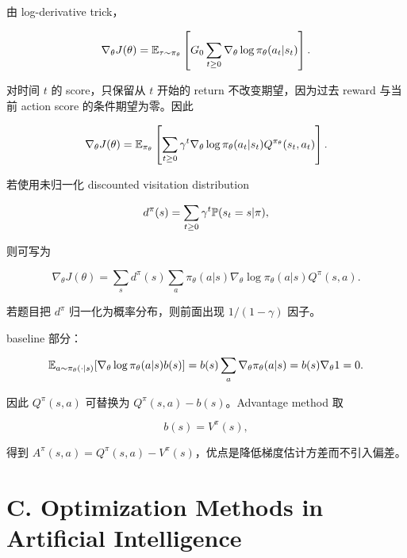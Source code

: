 由 log-derivative trick，

\[
  \nabla_\theta J(\theta)
  =
  \mathbb{E}_{\tau\sim\pi_\theta}
  \left[
    G_0
    \sum_{t\ge0}\nabla_\theta\log\pi_\theta(a_t|s_t)
  \right].
\]

对时间 \(t\) 的 score，只保留从 \(t\) 开始的 return 不改变期望，因为过去 reward 与当前 action score 的条件期望为零。因此

\[
  \nabla_\theta J(\theta)
  =
  \mathbb{E}_{\pi_\theta}
  \left[
    \sum_{t\ge0}
    \gamma^t
    \nabla_\theta\log\pi_\theta(a_t|s_t)
    Q^{\pi_\theta}(s_t,a_t)
  \right].
\]

若使用未归一化 discounted visitation distribution

\[
  d^\pi(s)=\sum_{t\ge0}\gamma^t\mathbb{P}(s_t=s|\pi),
\]

则可写为

\[
  \nabla_\theta J(\theta)
  =
  \sum_s d^\pi(s)\sum_a\pi_\theta(a|s)
  \nabla_\theta\log\pi_\theta(a|s)Q^\pi(s,a).
\]

若题目把 \(d^\pi\) 归一化为概率分布，则前面出现 \(1/(1-\gamma)\) 因子。

baseline 部分：

\[
  \mathbb{E}_{a\sim\pi_\theta(\cdot|s)}
  [\nabla_\theta\log\pi_\theta(a|s)b(s)]
  =
  b(s)\sum_a \nabla_\theta\pi_\theta(a|s)
  =
  b(s)\nabla_\theta 1
  =
  0.
\]

因此 \(Q^\pi(s,a)\) 可替换为 \(Q^\pi(s,a)-b(s)\)。Advantage method 取

\[
  b(s)=V^\pi(s),
\]

得到 \(A^\pi(s,a)=Q^\pi(s,a)-V^\pi(s)\)，优点是降低梯度估计方差而不引入偏差。

\section{C. Optimization Methods in Artificial Intelligence}

